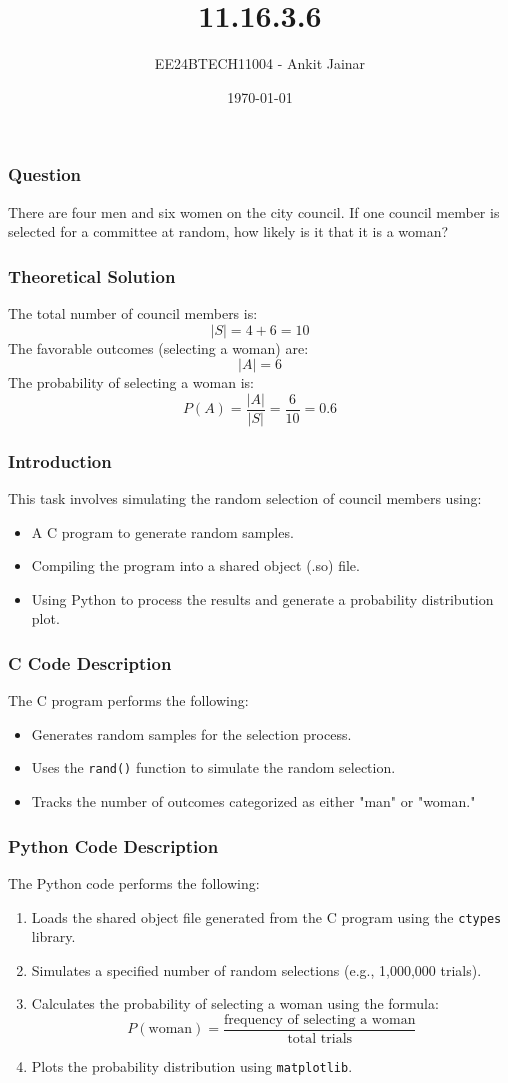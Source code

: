 \documentclass{beamer}
\title{11.16.3.6}
\author{EE24BTECH11004 - Ankit Jainar}
\date{\today}
\begin{document}
\frame{\titlepage}

\begin{frame}
\frametitle{Question}
There are four men and six women on the city council. If one council member is selected for a committee at random, how likely is it that it is a woman?
\end{frame}

\begin{frame}
\frametitle{Theoretical Solution}
The total number of council members is:
\[
|S| = 4 + 6 = 10
\]
The favorable outcomes (selecting a woman) are:
\[
|A| = 6
\]
The probability of selecting a woman is:
\[
P(A) = \frac{|A|}{|S|} = \frac{6}{10} = 0.6
\]
\end{frame}

\begin{frame}
\frametitle{Introduction}
This task involves simulating the random selection of council members using:
\begin{itemize}
    \item A C program to generate random samples.
    \item Compiling the program into a shared object (.so) file.
    \item Using Python to process the results and generate a probability distribution plot.
\end{itemize}
\end{frame}

\begin{frame}
\frametitle{C Code Description}
The C program performs the following:
\begin{itemize}
    \item Generates random samples for the selection process.
    \item Uses the \texttt{rand()} function to simulate the random selection.
    \item Tracks the number of outcomes categorized as either "man" or "woman."
\end{itemize}
\end{frame}

\begin{frame}
\frametitle{Python Code Description}
The Python code performs the following:
\begin{enumerate}
    \item Loads the shared object file generated from the C program using the \texttt{ctypes} library.
    \item Simulates a specified number of random selections (e.g., 1,000,000 trials).
    \item Calculates the probability of selecting a woman using the formula:
    \[
    P(\text{woman}) = \frac{\text{frequency of selecting a woman}}{\text{total trials}}
    \]
    \item Plots the probability distribution using \texttt{matplotlib}.
\end{enumerate}
\end{frame}
\end{document}
